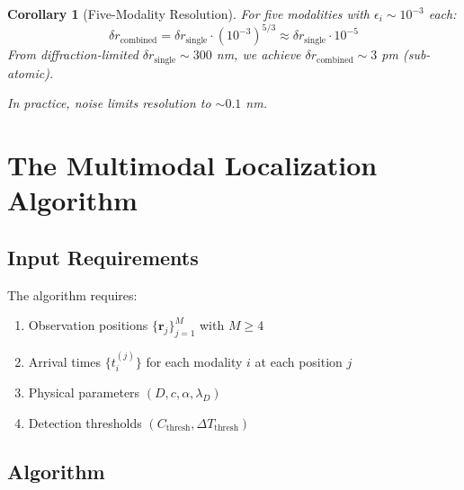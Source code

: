 \documentclass[11pt,a4paper]{article}
\newtheorem{corollary}[theorem]{Corollary}
\theoremstyle{remark}
\newcommand{\obspos}{\mathbf{r}}
\begin{document}
\begin{corollary}[Five-Modality Resolution]
For five modalities with $\epsilon_i \sim 10^{-3}$ each:
\begin{equation}
    \delta r_{\text{combined}} = \delta r_{\text{single}} \cdot (10^{-3})^{5/3} \approx \delta r_{\text{single}} \cdot 10^{-5}
\end{equation}
From diffraction-limited $\delta r_{\text{single}} \sim 300$ nm, we achieve $\delta r_{\text{combined}} \sim 3$ pm (sub-atomic).

In practice, noise limits resolution to $\sim 0.1$ nm.
\end{corollary}

\section{The Multimodal Localization Algorithm}
\label{sec:algorithm}

\subsection{Input Requirements}

The algorithm requires:
\begin{enumerate}
    \item Observation positions $\{\obspos_j\}_{j=1}^M$ with $M \geq 4$
    \item Arrival times $\{t_i^{(j)}\}$ for each modality $i$ at each position $j$
    \item Physical parameters $(D, c, \alpha, \lambda_D)$
    \item Detection thresholds $(C_{\text{thresh}}, \Delta T_{\text{thresh}})$
\end{enumerate}

\subsection{Algorithm}
\end{document}
